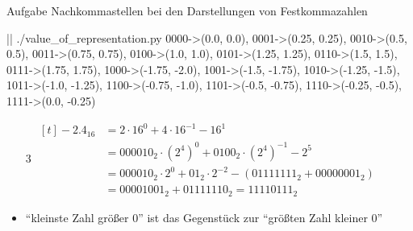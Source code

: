 \begin{frame}{Aufgabe \thesection}{Nachkommastellen bei den Darstellungen von Festkommazahlen\vspace{0.5cm}}
    \begin{requirementsnoinc}
    \end{requirementsnoinc}
    \begin{requirementsnoinc}
        \begin{terminal}
            |\prompt| ./value_of_representation.py
            {0000->(0.0, 0.0), 0001->(0.25, 0.25), 0010->(0.5, 0.5), 0011->(0.75, 0.75), 0100->(1.0, 1.0), 0101->(1.25, 1.25), 
            0110->(1.5, 1.5), 0111->(1.75, 1.75),  1000->(-1.75, -2.0), 1001->(-1.5, -1.75), 1010->(-1.25, -1.5), 
            1011->(-1.0, -1.25), 1100->(-0.75, -1.0), 1101->(-0.5, -0.75), 1110->(-0.25, -0.5), 1111->(0.0, -0.25)}        
        \end{terminal}
    \end{requirementsnoinc}
    \begin{solutionnoinc}
        \begin{enumerate}
            \item[3] $\begin{aligned}[t]
            -2.4_{16} &= 2 \cdot 16^0 + 4 \cdot 16^{-1} - 16^{1} \\
            &= 000010_2 \cdot (2^4)^0 + 0100_2 \cdot (2^4)^{-1} - 2^5 \\
            &= 000010_2 \cdot 2^0 + 01_2 \cdot 2^{-2} - (01111111_2 + 00000001_2)  \\
            &= 00001001_2 + 01111110_2 = 11110111_2
            \end{aligned}$
        \end{enumerate}
    \end{solutionnoinc}

    \begin{Sidenote}
        \begin{itemize}
            \item \enquote{kleinste Zahl größer $0$} ist das Gegenstück zur \enquote{größten Zahl kleiner $0$}
        \end{itemize}
    \end{Sidenote}


\end{frame}
